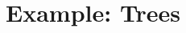\documentclass[11pt,reqno]{amsart}
\DeclareMathOperator{\Pic}{Pic}
\theoremstyle{definition}
\theoremstyle{plain}
\begin{document}


\section{Example: Trees}
\end{document}
